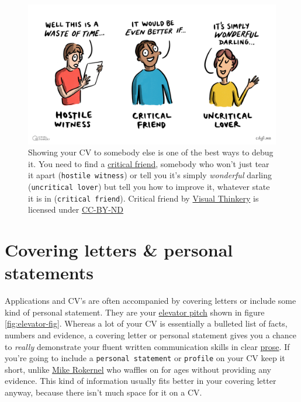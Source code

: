\documentclass[
]{book}
\begin{document}
\begin{figure}

{\centering \includegraphics[width=1\linewidth]{images/Critical Friend} 

}

\caption{Showing your CV to somebody else is one of the best ways to debug it. You need to find a \href{https://en.wikipedia.org/wiki/Critical_friend}{critical friend}, somebody who won't just tear it apart (\texttt{hostile\ witness}) or tell you it's simply \emph{wonderful} darling (\texttt{uncritical\ lover}) but tell you how to improve it, whatever state it is in (\texttt{critical\ friend}). Critical friend by \href{https://visualthinkery.com/}{Visual Thinkery} is licensed under \href{https://creativecommons.org/licenses/by-nd/4.0/}{CC-BY-ND}}\label{fig:wonderfuldarling-fig}
\end{figure}



\hypertarget{we3qs}{%
\section{Covering letters \& personal statements}\label{we3qs}}

Applications and CV's are often accompanied by covering letters or include some kind of personal statement. They are your \href{https://en.wikipedia.org/wiki/Elevator_pitch}{elevator pitch} shown in figure \ref{fig:elevator-fig}. Whereas a lot of your CV is essentially a bulleted list of facts, numbers and evidence, a covering letter or personal statement gives you a chance to \emph{really} demonstrate your fluent written communication skills in clear \href{https://en.wikipedia.org/wiki/Prose}{prose}. If you're going to include a \texttt{personal\ statement} or \texttt{profile} on your CV keep it short, unlike \href{https://www.cdyf.me/mike_rokernel.pdf}{Mike Rokernel} who waffles on for ages without providing any evidence. This kind of information usually fits better in your covering letter anyway, because there isn't much space for it on a CV.
\end{document}
